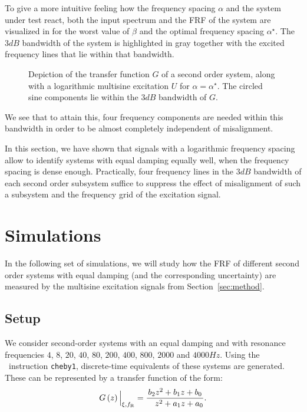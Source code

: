   To give a more intuitive feeling how the frequency spacing $\alpha$ and the system under test react, both the input spectrum and the FRF of the system are visualized in  for the worst value of $\beta$ and the optimal frequency spacing $\alpha^{\star}$.
  The $3\unit{dB}$ bandwidth of the system is highlighted in gray together with the excited frequency lines that lie within that bandwidth.

  \begin{figure}%
    \centering
      \setlength\figureheight{4cm}
      \setlength{}
    
    \caption[System with highlighted bandwidth and multisine components.]{Depiction of the transfer function $G$ of a second order system, along with a logarithmic multisine excitation $U$ for $\alpha = \alpha^{\star}$. The circled sine components lie within the $3 \unit{dB}$ bandwidth of $G$.}%
    \label{fig:signalAndSystem}
  \end{figure}

  We see that to attain this, four frequency components are needed within this bandwidth in order to be almost completely independent of misalignment.

  In this section, we have shown that signals with a logarithmic frequency spacing allow to identify systems with equal damping equally well, when the frequency spacing is dense enough.
  Practically, four frequency lines in the $3\unit{dB}$ bandwidth of each second order subsystem suffice to suppress the effect of misalignment of such a subsystem and the frequency grid of the excitation signal.
  
\section{Simulations} \label{sec:simulation}
In the following set of simulations, we will study how the FRF of different second order systems with equal damping (and the corresponding uncertainty) are measured by the multisine excitation signals from Section~\ref{sec:method}.
  \subsection{Setup}
  We consider second-order systems with an equal damping and with resonance frequencies $4$, $8$, $20$, $40$, $80$, $200$, $400$, $800$, $2000$ and $4000 \unit{Hz}$.
  Using the \matlab\ instruction \texttt{cheby1}, discrete-time equivalents of these systems are generated.
  These can be represented by a transfer function of the form:
  \begin{equation}
    G \left( z \right)\Big|_{\damping, \fR} =
       \frac{         b_2  z^{2} + b_1 z + b_0}%
            {\phantom{a_2} z^{2} + a_1 z + a_0}
  \text{.}
  \label{eq:secondOrderSystemDTidentifiable}
  \end{equation}


